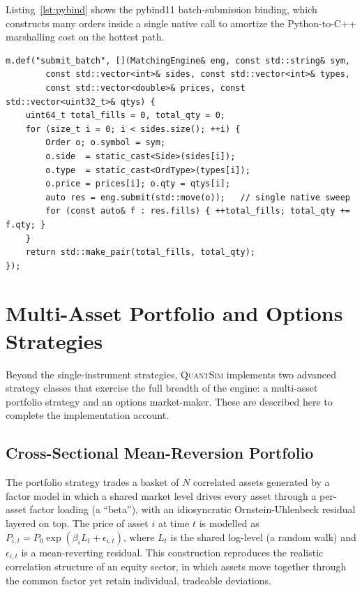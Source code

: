 \documentclass[12pt,oneside,a4paper]{report}
\newcommand{\quantsim}{\textsc{QuantSim}}
\begin{document}
Listing~\ref{lst:pybind} shows the pybind11 batch-submission binding, which constructs many orders inside a single native call to amortize the Python-to-C++ marshalling cost on the hottest path.

\begin{lstlisting}[style=cppstyle,caption={pybind11 batch-submission binding for the hot path},label={lst:pybind}]
m.def("submit_batch", [](MatchingEngine& eng, const std::string& sym,
        const std::vector<int>& sides, const std::vector<int>& types,
        const std::vector<double>& prices, const std::vector<uint32_t>& qtys) {
    uint64_t total_fills = 0, total_qty = 0;
    for (size_t i = 0; i < sides.size(); ++i) {
        Order o; o.symbol = sym;
        o.side  = static_cast<Side>(sides[i]);
        o.type  = static_cast<OrdType>(types[i]);
        o.price = prices[i]; o.qty = qtys[i];
        auto res = eng.submit(std::move(o));   // single native sweep
        for (const auto& f : res.fills) { ++total_fills; total_qty += f.qty; }
    }
    return std::make_pair(total_fills, total_qty);
});
\end{lstlisting}

\section{Multi-Asset Portfolio and Options Strategies}
\label{sec:advstrat}

Beyond the single-instrument strategies, \quantsim{} implements two advanced strategy classes that exercise the full breadth of the engine: a multi-asset portfolio strategy and an options market-maker. These are described here to complete the implementation account.

\subsection{Cross-Sectional Mean-Reversion Portfolio}

The portfolio strategy trades a basket of $N$ correlated assets generated by a factor model in which a shared market level drives every asset through a per-asset factor loading (a ``beta''), with an idiosyncratic Ornstein-Uhlenbeck residual layered on top. The price of asset $i$ at time $t$ is modelled as $P_{i,t} = P_{0}\exp(\beta_i L_t + \epsilon_{i,t})$, where $L_t$ is the shared log-level (a random walk) and $\epsilon_{i,t}$ is a mean-reverting residual. This construction reproduces the realistic correlation structure of an equity sector, in which assets move together through the common factor yet retain individual, tradeable deviations.
\end{document}
